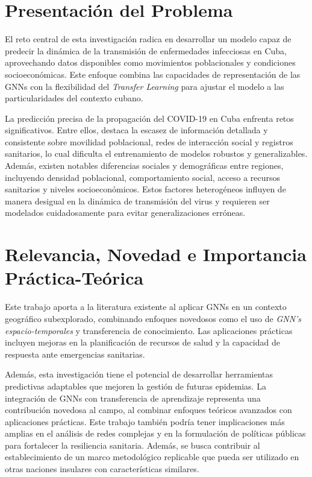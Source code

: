 \section*{Presentación del Problema}
El reto central de esta investigación radica en desarrollar un modelo capaz de predecir la dinámica de la transmisión de enfermedades infecciosas en Cuba, aprovechando datos disponibles como movimientos poblacionales y condiciones socioeconómicas. Este enfoque combina las capacidades de representación de las GNNs con la flexibilidad del \textit{Transfer Learning} para ajustar el modelo a las particularidades del contexto cubano.

La predicción precisa de la propagación del COVID-19 en Cuba enfrenta retos significativos. Entre ellos, destaca la escasez de información detallada y consistente sobre movilidad poblacional, redes de interacción social y registros sanitarios, lo cual dificulta el entrenamiento de modelos robustos y generalizables. Además, existen notables diferencias sociales y demográficas entre regiones, incluyendo densidad poblacional, comportamiento social, acceso a recursos sanitarios y niveles socioeconómicos. Estos factores heterogéneos influyen de manera desigual en la dinámica de transmisión del virus y requieren ser modelados cuidadosamente para evitar generalizaciones erróneas.

\section*{Relevancia, Novedad e Importancia Práctica-Teórica}
Este trabajo aporta a la literatura existente al aplicar GNNs en un contexto geográfico subexplorado, combinando enfoques novedosos como el uso de \textit{GNN's espacio-temporales} y transferencia de conocimiento. Las aplicaciones prácticas incluyen mejoras en la planificación de recursos de salud y la capacidad de respuesta ante emergencias sanitarias.

Además, esta investigación tiene el potencial de desarrollar herramientas predictivas adaptables que mejoren la gestión de futuras epidemias. La integración de GNNs con transferencia de aprendizaje representa una contribución novedosa al campo, al combinar enfoques teóricos avanzados con aplicaciones prácticas. Este trabajo también podría tener implicaciones más amplias en el análisis de redes complejas y en la formulación de políticas públicas para fortalecer la resiliencia sanitaria. Además, se busca contribuir al establecimiento de un marco metodológico replicable que pueda ser utilizado en otras naciones insulares con características similares.

